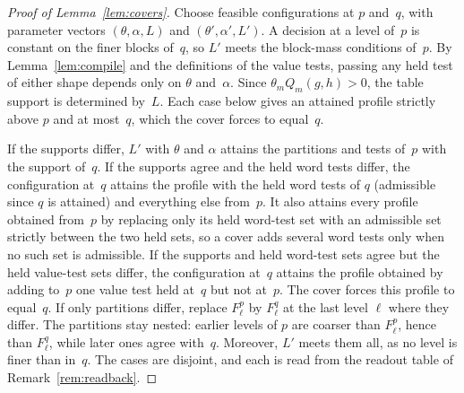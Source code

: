 \begin{proof}[Proof of Lemma~\ref{lem:covers}]
Choose feasible configurations at $p$ and~$q$, with parameter vectors
$(\theta,\alpha,L)$ and $(\theta',\alpha',L')$. %
A decision at a level of~$p$ is constant on the finer blocks of~$q$, so
$L'$ meets the block-mass conditions of~$p$. By Lemma~\ref{lem:compile}
and the definitions of the value tests, passing any held test of either
shape depends only on $\theta$ and~$\alpha$. Since $\theta_mQ_m(g,h)>0$,
the table support is determined by~$L$. Each case below gives an attained
profile strictly above $p$ and at most~$q$, which the cover forces to
equal~$q$.

If the supports differ, $L'$ with $\theta$ and $\alpha$ attains the
partitions and tests of~$p$ with the support of~$q$. If the supports agree
and the held word tests differ, the configuration at~$q$ attains the
profile with the held word tests of $q$ (admissible since $q$ is attained)
and everything else from~$p$. It also
attains every profile obtained from~$p$ by replacing only its held
word-test set with an admissible set strictly between the two held sets,
so a cover adds several word tests only when no such set is admissible. %
If the supports and held word-test sets agree but the held value-test sets
differ, the configuration at~$q$ attains the profile obtained by adding
to~$p$ one value test held at~$q$ but not at~$p$. The cover forces this
profile to equal~$q$. If only partitions differ, replace $F^p_\ell$ by $F^q_\ell$ at the
last level $\ell$ where they differ. The partitions stay nested: earlier
levels of $p$ are coarser than $F^p_\ell$, hence than $F^q_\ell$, while
later ones agree with~$q$. Moreover, $L'$ meets them all, as no level is
finer than in~$q$. The cases are disjoint, and each
is read from the readout table of Remark~\ref{rem:readback}.
\end{proof}


